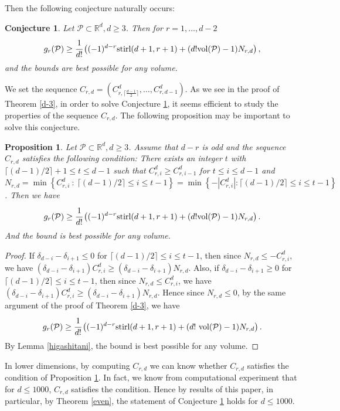 \documentclass[12pt]{amsart}
\newtheorem{proposition}[theorem]{Proposition}
\newtheorem{conjecture}[theorem]{Conjecture}
\theoremstyle{definition}
\theoremstyle{remark}
\numberwithin{equation}{section}
\def\Pc{{\mathcal P}}
\def\NZQ{\mathbb}               %
\def\RR{{\NZQ R}}
\begin{document}
Then the following conjecture naturally occurs:

\begin{conjecture}
	\label{conj}
	Let $\Pc \subset \RR^d, d \geq 3 $. 
	Then for $r=1,\ldots,d-2$ 
	$$g_{r}(\Pc) \geq \cfrac{1}{d!}\left((-1)^{d-r}\textnormal{stirl}(d+1,r+1)+(d!\textnormal{vol}(\Pc)-1)N_{r,d}\right),$$
	and the bounds are best possible for any volume.	
\end{conjecture}

We set the sequence $C_{r,d}=(C_{r,\lceil\frac{d-1}{2}\rceil}^d,\ldots,C_{r,d-1}^d)$.
As we see in the proof of Theorem \ref{d-3}, in order to solve Conjecture \ref{conj}, it seems efficient to study the properties of the sequence $C_{r,d}$.
The following proposition may be important to solve this conjecture.

\begin{proposition}
	\label{prop}
Let $\Pc \subset \RR^d, d \geq 3$. 
Assume that $d-r$ is odd and the sequence $C_{r,d}$ satisfies the following condition\textnormal{:}
There exists an integer $t$ with $\lceil(d-1)/2 \rceil+1 \leq t \leq d-1$ such that 
$C_{r,i}^d \geq C_{r,i-1}^d$ for $t \leq i \leq d-1$ and $N_{r,d}=\min\left\{C_{r,i}^d\ : \ \lceil(d-1)/2\rceil \leq i \leq t-1\right\}=\min\left\{-|C_{r,i}^d|:\lceil(d-1)/2\rceil \leq i \leq t-1\right\}$.
Then we have
$$g_{r}(\Pc) \geq \cfrac{1}{d!}\left((-1)^{d-r}\textnormal{stirl}(d+1,r+1)+(d!\textnormal{vol}(\Pc)-1)N_{r,d}\right).$$
And the bound is best possible for any volume.
\end{proposition}
\begin{proof}
If $\delta_{d-i}-\delta_{i+1} \leq 0$ for $\lceil(d-1)/2\rceil \leq i \leq t-1$,
then since $N_{r,d} \leq -C_{r,i}^d$, we have $(\delta_{d-i}-\delta_{i+1})C_{r,i}^d \geq (\delta_{d-i}-\delta_{i+1})N_{r,d}$.
Also, if $\delta_{d-i}-\delta_{i+1} \geq 0$  for $\lceil(d-1)/2\rceil \leq i \leq t-1$, 
then since $N_{r,d} \leq C_{r,i}^d$, we have $(\delta_{d-i}-\delta_{i+1})C_{r,i}^d \geq (\delta_{d-i}-\delta_{i+1})N_{r,d}$.
Hence since $N_{r,d}\leq 0$, by the same argument of the proof of Theorem \ref{d-3}, we have 
$$g_{r}(\Pc) \geq \cfrac{1}{d!}\left((-1)^{d-r}\textnormal{stirl}(d+1,r+1)+(d!\textnormal{
	vol}(\Pc)-1)N_{r,d}\right).$$
By Lemma \ref{higashitani}, the bound is best possible for any volume.
\end{proof}

In lower dimensions, by computing $C_{r,d}$ we can know whether $C_{r,d}$ satisfies the condition of Proposition \ref{prop}.
In fact, we know from computational experiment that for $d\leq 1000$, $C_{r,d}$ satisfies the condition.
Hence by results of this paper, in particular, by Theorem \ref{even}, the statement of Conjecture \ref{conj} holds for $d \leq 1000$.
\end{document}
